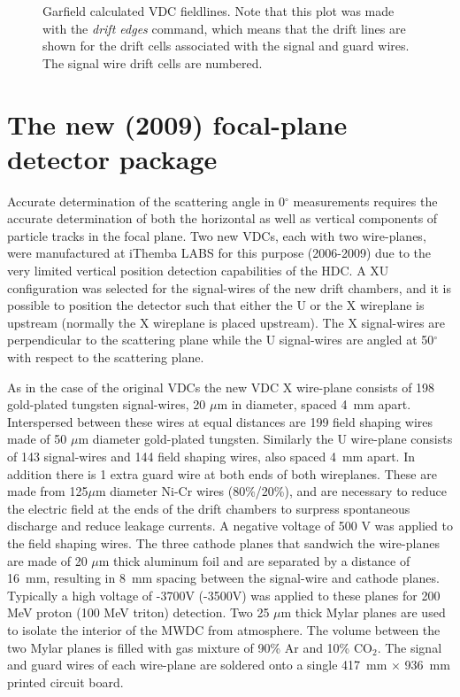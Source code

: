 \documentclass[11pt]{report}
\begin{document}
\begin{figure}
\centerline{\vspace{0cm}\hspace{0cm}
}
\centering
\caption{Garfield calculated VDC fieldlines. Note that this plot was made with the {\it drift edges}
command, which means that the drift lines are shown for the drift cells associated with the 
signal and guard wires. The signal wire drift cells are numbered.}
\label{fig:vdcfieldlines}
\end{figure} 


\section{The new (2009) focal-plane detector package}

Accurate determination of the scattering angle in 0$^{\circ}$ measurements requires the accurate 
determination of both the horizontal as well as vertical components of particle tracks 
in the focal plane.  
Two new VDCs, each with two wire-planes, were manufactured
at iThemba LABS for this purpose (2006-2009)
due to the very limited vertical position detection capabilities of the HDC.
%
A XU configuration was selected for the signal-wires of the new drift chambers, and it is possible to position 
the detector such that either the U or the X wireplane is upstream (normally the X wireplane is placed upstream).
The X signal-wires are perpendicular to the scattering plane while the U signal-wires
are angled at 50$^{\circ}$ with respect to the scattering plane.

As in the case of the original VDCs the new VDC X wire-plane 
consists of 198 gold-plated tungsten signal-wires, 20 $\mu $m in diameter,
spaced 4~mm apart. 
Interspersed between these wires at equal distances are 199 field shaping wires 
made of 50 $\mu $m diameter gold-plated tungsten.  Similarly the 
U wire-plane consists of 143 signal-wires and 144 field shaping wires, also spaced 4~mm apart.
%
In addition there is 1 extra guard wire at both ends of both wireplanes. These are made from
125$\mu$m diameter Ni-Cr wires (80\%/20\%), and are necessary to reduce the electric field
at the ends of the drift chambers to surpress spontaneous discharge and reduce leakage currents.
%
A negative voltage of 500 V was applied to the field shaping wires.
The three cathode planes that sandwich the wire-planes are made of 20 $\mu$m thick aluminum foil 
and are separated by a distance of 16~mm, resulting in 8~mm spacing between the signal-wire 
and cathode planes.
Typically a high voltage of -3700V (-3500V) was applied to these planes for 200 MeV proton (100 MeV triton)
detection. 
Two 25 $\mu$m thick Mylar planes are used to isolate the interior 
of the MWDC from atmosphere. The volume between the two Mylar planes is
filled with gas mixture of 90\% Ar and 10\% CO$_{2}$.
%
The signal and guard wires of each wire-plane are soldered 
onto a single 417~mm $\times$ 936~mm printed circuit board. 
\end{document}
